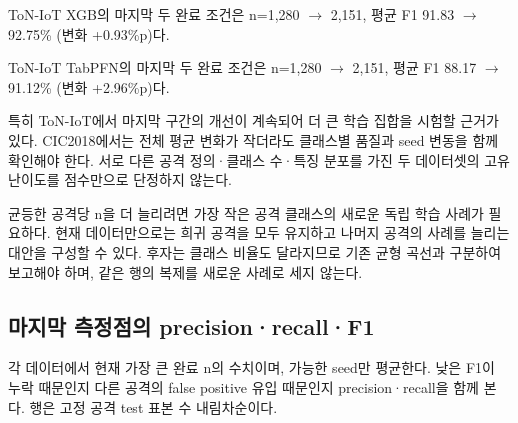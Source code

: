 ToN-IoT XGB의 마지막 두 완료 조건은 n=\allowbreak{}1,280 \ensuremath{\rightarrow} 2,151, 평균 F1 91.83 \ensuremath{\rightarrow} 92.75\% (변화 +\allowbreak{}0.93\%p)다.

ToN-IoT TabPFN의 마지막 두 완료 조건은 n=\allowbreak{}1,280 \ensuremath{\rightarrow} 2,151, 평균 F1 88.17 \ensuremath{\rightarrow} 91.12\% (변화 +\allowbreak{}2.96\%p)다.

특히 ToN-IoT에서 마지막 구간의 개선이 계속되어 더 큰 학습 집합을 시험할 근거가 있다. CIC2018에서는 전체 평균 변화가 작더라도 클래스별 품질과 seed 변동을 함께 확인해야 한다. 서로 다른 공격 정의·클래스 수·특징 분포를 가진 두 데이터셋의 고유 난이도를 점수만으로 단정하지 않는다.

균등한 공격당 n을 더 늘리려면 가장 작은 공격 클래스의 새로운 독립 학습 사례가 필요하다. 현재 데이터만으로는 희귀 공격을 모두 유지하고 나머지 공격의 사례를 늘리는 대안을 구성할 수 있다. 후자는 클래스 비율도 달라지므로 기존 균형 곡선과 구분하여 보고해야 하며, 같은 행의 복제를 새로운 사례로 세지 않는다.

\subsection{마지막 측정점의 precision·recall·F1}
각 데이터에서 현재 가장 큰 완료 n의 수치이며, 가능한 seed만 평균한다. 낮은 F1이 누락 때문인지 다른 공격의 false positive 유입 때문인지 precision·recall을 함께 본다. 행은 고정 공격 test 표본 수 내림차순이다.

